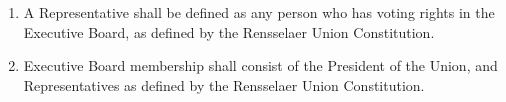 \begin{enumerate}
\item A Representative shall be defined as any person who has voting rights in the Executive Board, as defined by the Rensselaer Union Constitution.
\item Executive Board membership shall consist of the President of the Union, and Representatives as defined by the Rensselaer Union Constitution. 
\end{enumerate}